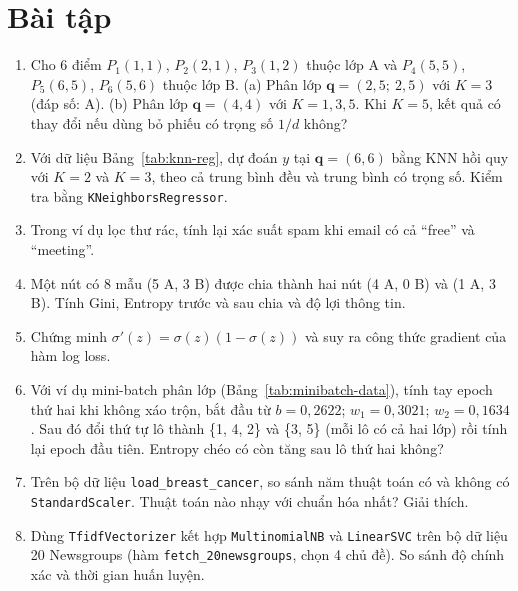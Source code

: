 \section{Bài tập}
\begin{enumerate}
    \item Cho 6 điểm $P_1(1, 1)$, $P_2(2, 1)$, $P_3(1, 2)$ thuộc lớp A và $P_4(5, 5)$, $P_5(6, 5)$, $P_6(5, 6)$ thuộc lớp B. (a) Phân lớp $\mathbf{q} = (2{,}5;\ 2{,}5)$ với $K = 3$ (đáp số: A). (b) Phân lớp $\mathbf{q} = (4, 4)$ với $K = 1, 3, 5$. Khi $K = 5$, kết quả có thay đổi nếu dùng bỏ phiếu có trọng số $1/d$ không?
    \item Với dữ liệu Bảng~\ref{tab:knn-reg}, dự đoán $y$ tại $\mathbf{q} = (6, 6)$ bằng KNN hồi quy với $K = 2$ và $K = 3$, theo cả trung bình đều và trung bình có trọng số. Kiểm tra bằng \texttt{KNeighborsRegressor}.
    \item Trong ví dụ lọc thư rác, tính lại xác suất spam khi email có cả ``free'' và ``meeting''.
    \item Một nút có 8 mẫu (5 A, 3 B) được chia thành hai nút (4 A, 0 B) và (1 A, 3 B). Tính Gini, Entropy trước và sau chia và độ lợi thông tin.
    \item Chứng minh $\sigma'(z) = \sigma(z)(1 - \sigma(z))$ và suy ra công thức gradient của hàm log loss.
    \item Với ví dụ mini-batch phân lớp (Bảng~\ref{tab:minibatch-data}), tính tay epoch thứ hai khi không xáo trộn, bắt đầu từ $b = 0{,}2622$; $w_1 = 0{,}3021$; $w_2 = 0{,}1634$. Sau đó đổi thứ tự lô thành \{1, 4, 2\} và \{3, 5\} (mỗi lô có cả hai lớp) rồi tính lại epoch đầu tiên. Entropy chéo có còn tăng sau lô thứ hai không?
    \item Trên bộ dữ liệu \texttt{load\_breast\_cancer}, so sánh năm thuật toán có và không có \texttt{StandardScaler}. Thuật toán nào nhạy với chuẩn hóa nhất? Giải thích.
    \item Dùng \texttt{TfidfVectorizer} kết hợp \texttt{MultinomialNB} và \texttt{LinearSVC} trên bộ dữ liệu 20 Newsgroups (hàm \texttt{fetch\_20newsgroups}, chọn 4 chủ đề). So sánh độ chính xác và thời gian huấn luyện.
\end{enumerate}


